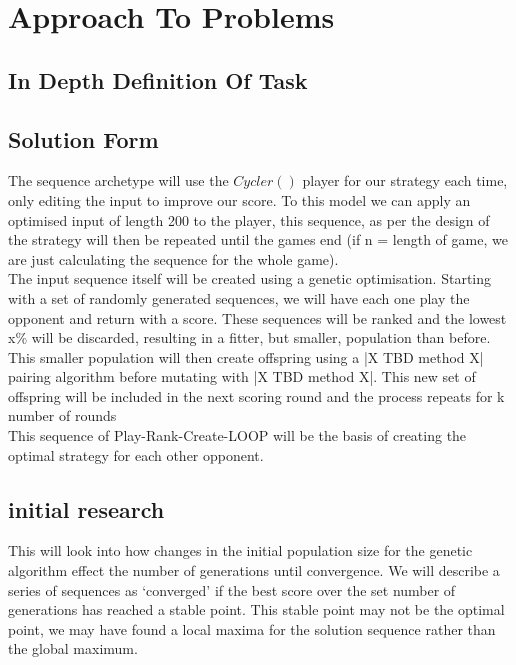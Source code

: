 
\chapter{Approach To Problems}\label{ch:approach}
    \section{In Depth Definition Of Task}
    \section{Solution Form}
The sequence archetype will use the \(Cycler()\) player for our strategy each time, only editing the input to improve our score. To this model we can apply an optimised input of length 200 to the player, this sequence, as per the design of the strategy will then be repeated until the games end (if n = length of game, we are just calculating the sequence for the whole game).\\

The input sequence itself will be created using a genetic optimisation. Starting with a set of randomly generated sequences, we will have each one play the opponent and return with a score. These sequences will be ranked and the lowest x\% will be discarded, resulting in a fitter, but smaller, population than before. This smaller population will then create offspring using a |X TBD method X| pairing algorithm before mutating with |X TBD method X|. This new set of offspring will be included in the next scoring round and the process repeats for k number of rounds\\

This sequence of Play-Rank-Create-LOOP will be the basis of creating the optimal strategy for each other opponent.

    \section{initial research}
    This will look into how changes in the initial population size for the genetic algorithm effect the number of generations until convergence. We will describe a series of sequences as `converged' if the best score over the set number of generations has reached a stable point. This stable point may not be the optimal point, we may have found a local maxima for the solution sequence rather than the global maximum. \\


